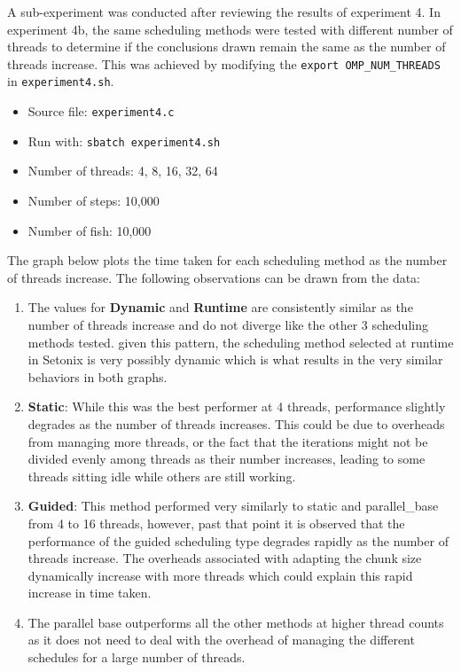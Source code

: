 \documentclass[
]{article}
\providecommand{\tightlist}{%
  \setlength{\itemsep}{0pt}\setlength{\parskip}{0pt}}
\begin{document}
A sub-experiment was conducted after reviewing the results of experiment
4. In experiment 4b, the same scheduling methods were tested with
different number of threads to determine if the conclusions drawn remain
the same as the number of threads increase. This was achieved by
modifying the \texttt{export\ OMP\_NUM\_THREADS} in
\texttt{experiment4.sh}.

\begin{itemize}
\tightlist
\item
  Source file: \texttt{experiment4.c}
\item
  Run with: \texttt{sbatch\ experiment4.sh}
\item
  Number of threads: 4, 8, 16, 32, 64
\item
  Number of steps: 10,000
\item
  Number of fish: 10,000
\end{itemize}

The graph below plots the time taken for each scheduling method as the
number of threads increase. The following observations can be drawn from
the data:

\begin{enumerate}
\def\labelenumi{\arabic{enumi}.}
\item
  The values for \textbf{Dynamic} and \textbf{Runtime} are consistently
  similar as the number of threads increase and do not diverge like the
  other 3 scheduling methods tested. given this pattern, the scheduling
  method selected at runtime in Setonix is very possibly dynamic which
  is what results in the very similar behaviors in both graphs.
\item
  \textbf{Static}: While this was the best performer at 4 threads,
  performance slightly degrades as the number of threads increases. This
  could be due to overheads from managing more threads, or the fact that
  the iterations might not be divided evenly among threads as their
  number increases, leading to some threads sitting idle while others
  are still working.
\item
  \textbf{Guided}: This method performed very similarly to static and
  parallel\_base from 4 to 16 threads, however, past that point it is
  observed that the performance of the guided scheduling type degrades
  rapidly as the number of threads increase. The overheads associated
  with adapting the chunk size dynamically increase with more threads
  which could explain this rapid increase in time taken.
\item
  The parallel base outperforms all the other methods at higher thread
  counts as it does not need to deal with the overhead of managing the
  different schedules for a large number of threads.
\end{enumerate}
\end{document}

